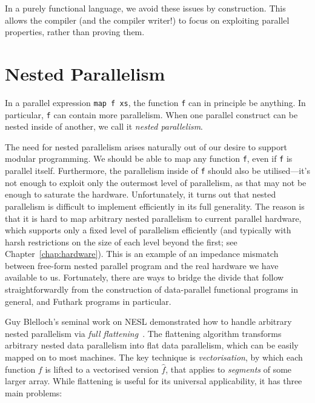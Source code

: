 In a purely functional language, we avoid these issues by
construction.  This allows the compiler (and the compiler writer!) to
focus on exploiting parallel properties, rather than proving them.

\section{Nested Parallelism}
\label{sec:nested-parallelism}

In a parallel expression \lstinline{map f xs}, the function
\lstinline{f} can in principle be anything.  In particular,
\lstinline{f} can contain more parallelism.  When one parallel
construct can be nested inside of another, we call it \textit{nested
  parallelism}.

The need for nested parallelism arises naturally out of our desire to
support modular programming.  We should be able to map any function
\lstinline{f}, even if \lstinline{f} is parallel itself.  Furthermore,
the parallelism inside of \lstinline{f} should also be utilised---it's
not enough to exploit only the outermost level of parallelism, as that
may not be enough to saturate the hardware.  Unfortunately, it turns
out that nested parallelism is difficult to implement efficiently in
its full generality.  The reason is that it is hard to map arbitrary
nested parallelism to current parallel hardware, which supports only a
fixed level of parallelism efficiently (and typically with harsh
restrictions on the size of each level beyond the first; see
Chapter~\ref{chap:hardware}).  This is an example of an impedance
mismatch between free-form nested parallel program and the real
hardware we have available to us.  Fortunately, there are ways to
bridge the divide that follow straightforwardly from the construction
of data-parallel functional programs in general, and Futhark programs
in particular.

Guy Blelloch's seminal work on NESL demonstrated how to handle
arbitrary nested parallelism via \textit{full
  flattening}~\cite{blelloch1994implementation}.  The flattening
algorithm transforms arbitrary nested data parallelism into flat data
parallelism, which can be easily mapped on to most machines.  The key
technique is \textit{vectorisation}, by which each function $f$ is
lifted to a vectorised version $\hat{f}$, that applies to
\textit{segments} of some larger array.  While flattening is useful
for its universal applicability, it has three main problems:


